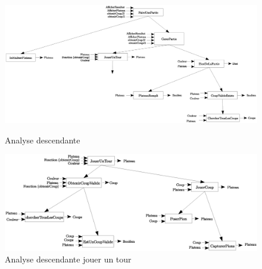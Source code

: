 \begin{figure}[ht]
  \centering
  \includegraphics[scale = 0.2]{rapport/sourcesIMAGES/analyse_descendante.eps}
  \caption{Analyse descendante}
  \includegraphics[scale = 0.2]{rapport/sourcesIMAGES/analyse_descendante_jouer_un_tour.eps}
  \caption{Analyse descendante jouer un tour}
\end{figure}
